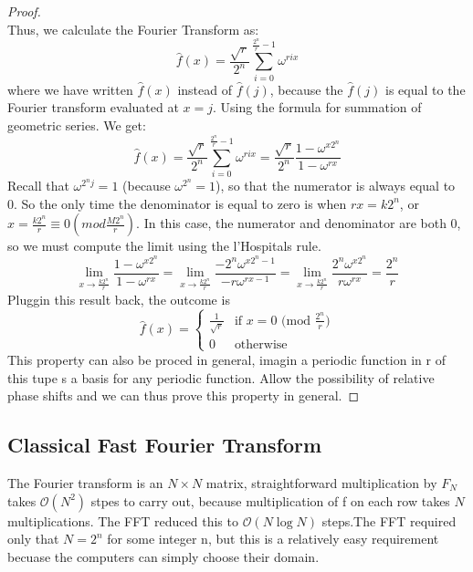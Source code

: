 \documentclass[12pt, oneside]{book}
\theoremstyle{definition}
\theoremstyle{definition}
\theoremstyle{remark}
\begin{document}
\begin{itemize}
\begin{proof}
\[        \]
        Thus, we calculate the Fourier Transform as:
        \[
        \hat{f}(x)=\frac{\sqrt{r}}{2^n}\sum_{i=0}^{\frac{2^n}{r}-1}\omega^{rix}
        \]
        where we have written $\hat{f}(x)$ instead of $\hat{f}(j)$, because the $\hat{f}(j)$ is
        equal to the Fourier transform evaluated at $x=j$.
        Using the formula for summation of geometric series. We get:
        \[
        \hat{f}(x)=\frac{\sqrt{r}}{2^n}\sum_{i=0}^{\frac{2^n}{r}-1}\omega^{rix}=\frac{\sqrt{r}}{2^n}\frac{1-\omega^{x2^n}}{1-\omega^{rx}}
        \]
        Recall that $\omega^{2^nj}=1$ (because $\omega^{2^n}=1$), so that the numerator is always equal to 0.
        So the only time the denominator is equal to zero is when $rx=k2^n$, or $x=\frac{k2^n}{r}\equiv 0 (mod \frac{M2^n}{r})$.
        In this case, the numerator and denominator are both 0, so we must compute the limit using the l'Hospitals rule.
        \[
        \lim_{x\rightarrow \frac{k2^n}{r}}\frac{1-\omega^{x2^n}}{1-\omega^{rx}}=\lim_{x\rightarrow \frac{k2^n}{r}}\frac{-2^n\omega^{x2^n-1}}{-r\omega^{rx-1}}=\lim_{x\rightarrow \frac{k2^n}{r}}\frac{2^n\omega^{x2^n}}{r\omega^{rx}}=\frac{2^n}{r}
        \]
        Pluggin this result back, the outcome is
        \[
        \hat{f}(x)=\begin{cases} \frac{1}{\sqrt{r}} & \text{if } x=0 \text{ (mod } \frac{2^n}{r}) \\ 0 & \text{otherwise}\end{cases}
        \]
        This property can also be proced in general, imagin a periodic function in r 
        of this tupe s a basis for any periodic function. Allow the possibility of relative phase shifts and we can thus prove this property in general.
    \end{proof}
\end{itemize}

\subsection{Classical Fast Fourier Transform}
The Fourier transform is an $N \times N$ matrix, straightforward multiplication by $F_{N}$ takes 
$\mathcal{O}(N^2)$ stpes to carry out, because multiplication of f on each row takes $N$ multiplications.
The FFT reduced this to $\mathcal{O}(N\log N)$ steps.The FFT required only that $N=2^n$ for some integer n, but this is 
a relatively easy requirement becuase the computers can simply choose their domain.
\end{document}
